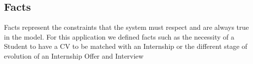 \subsection{Facts}
Facts represent the constraints that the system must respect and are always true in the model. For this application we defined facts such as the necessity of a Student to have a CV to be matched with an Internship or the different stage of evolution of an Internship Offer and Interview

